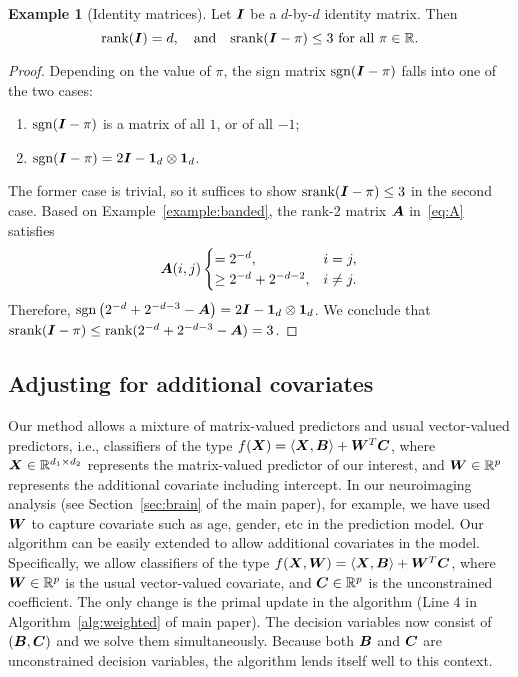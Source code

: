 \documentclass[11pt]{article}
\theoremstyle{plain}
\theoremstyle{definition}
\newtheorem{example}{Example}
\def\sign{\textup{sgn}}
\def\srank{\textup{srank}}
\def\rank{\textup{rank}}
\begin{document}
\begin{example}[Identity matrices]
Let $\bm I$ be a $d$-by-$d$ identity matrix. Then
\[
\rank(\mI)=d,\quad\text{and}\quad  \srank(\mI-\pi)\leq 3 \ \text{for all }\pi\in\mathbb{R}.
\]
\end{example}
\begin{proof}
Depending on the value of $\pi$, the sign matrix $\sign(\mI-\pi)$ falls into one of the two cases: 
\begin{enumerate}
\item $\sign(\mI-\pi)$ is a matrix of all $1$, or of all $-1$; 
\item $\sign(\mI-\pi)=2\mI-\mathbf{1}_d\otimes \mathbf{1}_d$.
\end{enumerate}
The former case is trivial, so it suffices to show $\srank(\mI-\pi)\leq 3$ in the second case. Based on Example~\ref{example:banded}, the rank-2 matrix $\bm A$ in~\eqref{eq:A} satisfies 
\[
\bm A(i,j)
\begin{cases}
=2^{-d}, & i=j,\\
\geq 2^{-d}+2^{-d-2}, & i\neq j.
\end{cases}
\]
Therefore, $\sign\left(2^{-d}+2^{-d-3}-\mA\right)=2\mI-\mathbf{1}_d\otimes \mathbf{1}_d$. We conclude that $\srank(\mI-\pi)\leq \rank(2^{-d}+2^{-d-3}-\mA)=3$. 
\end{proof}


\subsection{Adjusting for additional covariates}
Our method allows a mixture of matrix-valued predictors and usual vector-valued predictors, i.e., classifiers of the type $f(\bm X)=\langle \bm X, \bm B\rangle+\bm{W}^T\bm C$, where $\bm X\in\mathbb{R}^{d_1\times d_2}$ represents the matrix-valued predictor of our interest, and $\bm{W}\in\mathbb{R}^{p}$ represents the additional covariate including intercept. In our neuroimaging analysis (see Section~\ref{sec:brain} of the main paper), for example, we have used $\bm{W}$ to capture covariate such as age, gender, etc in the prediction model. Our algorithm can be easily extended to allow additional covariates in the model. Specifically, we allow classifiers of the type $f(\bm X,\bm{W})=\langle \bm X,\bm B\rangle+\bm{W}^T\bm C$, where $\bm{W}\in\mathbb{R}^p$ is the usual vector-valued covariate, and $\bm C\in\mathbb{R}^p$ is the unconstrained coefficient. The only change is the primal update in the algorithm (Line 4 in Algorithm~\ref{alg:weighted} of main paper). The decision variables now consist of $(\bm B,\bm C)$ and we solve them simultaneously. Because both $\bm B$ and $\bm C$ are unconstrained decision variables, the algorithm lends itself well to this context. 
\end{document}
